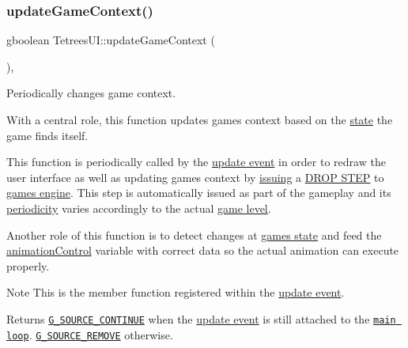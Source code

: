 \subsubsection{\texorpdfstring{update\+Game\+Context()}{updateGameContext()}}
{\footnotesize\ttfamily gboolean Tetrees\+U\+I\+::update\+Game\+Context (\begin{DoxyParamCaption}{ }\end{DoxyParamCaption})\hspace{0.3cm}{\ttfamily [static]}, {\ttfamily [private]}}



Periodically changes game context. 

With a central role, this function updates game\textquotesingle{}s context based on the \hyperlink{TetreesDefs_8hpp_aebae08b2e3a36f1452b33acaf1eaab40}{state} the game finds itself.

This function is periodically called by the \hyperlink{TetreesDefs_8hpp_aaf9e35ddd627efe32323b1ba02ee514e}{update event} in order to redraw the user interface as well as updating game\textquotesingle{}s context by \hyperlink{classTetreesEngine_a33e9983a618b3538640b6bd987304b8b}{issuing} a \hyperlink{TetreesDefs_8hpp_a4d5a793092a473f85b4c1f7faf62afeda6df5f4c213c30a4ad91af7a5d10daa8e}{D\+R\+OP S\+T\+EP} to \hyperlink{classTetreesUI_a07faa56ea40b28beba7509fa7f65c897}{game\textquotesingle{}s engine}. This step is automatically issued as part of the gameplay and its \hyperlink{TetreesDefs_8hpp_a56295b647dadb94aa1662b267e1c9b6e}{periodicity} varies accordingly to the actual \hyperlink{classTetreesUI_a700b75dbee9c324c69a18f34c5efdab9}{game level}.

Another role of this function is to detect changes at \hyperlink{TetreesDefs_8hpp_aebae08b2e3a36f1452b33acaf1eaab40}{game\textquotesingle{}s state} and feed the \hyperlink{classTetreesUI_a06df6e44abd5d521448cf1299433b55c}{animation\+Control} variable with correct data so the actual animation can execute properly. \begin{DoxyNote}{Note}
This is the member function registered within the \hyperlink{TetreesDefs_8hpp_aaf9e35ddd627efe32323b1ba02ee514e}{update event}. 
\end{DoxyNote}
\begin{DoxyReturn}{Returns}
\href{https://developer.gnome.org/glib/stable/glib-The-Main-Event-Loop.html#G-SOURCE-CONTINUE:CAPS}{\tt G\+\_\+\+S\+O\+U\+R\+C\+E\+\_\+\+C\+O\+N\+T\+I\+N\+UE} when the \hyperlink{TetreesDefs_8hpp_aaf9e35ddd627efe32323b1ba02ee514e}{update event} is still attached to the \href{https://developer.gnome.org/glib/stable/glib-The-Main-Event-Loop.html#glib-The-Main-Event-Loop.description}{\tt main loop}. \href{https://developer.gnome.org/glib/stable/glib-The-Main-Event-Loop.html#G-SOURCE-REMOVE:CAPS}{\tt G\+\_\+\+S\+O\+U\+R\+C\+E\+\_\+\+R\+E\+M\+O\+VE} otherwise. 
\end{DoxyReturn}
\mbox{\label{classTetreesUI_ac41bb9dc9af1d051c54dd5f2dcf224a9}} 
